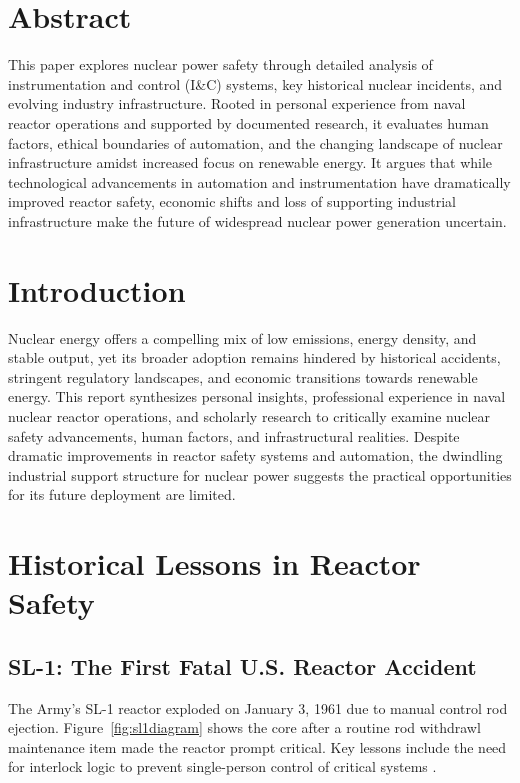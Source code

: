 \documentclass[12pt]{article}
\begin{document}
\section*{Abstract}
This paper explores nuclear power safety through detailed analysis of instrumentation and control (I\&C) systems, key historical nuclear incidents, and evolving industry infrastructure. Rooted in personal experience from naval reactor operations and supported by documented research, it evaluates human factors, ethical boundaries of automation, and the changing landscape of nuclear infrastructure amidst increased focus on renewable energy. It argues that while technological advancements in automation and instrumentation have dramatically improved reactor safety, economic shifts and loss of supporting industrial infrastructure make the future of widespread nuclear power generation uncertain.

\newpage

\section{Introduction}
Nuclear energy offers a compelling mix of low emissions, energy density, and stable output, yet its broader adoption remains hindered by historical accidents, stringent regulatory landscapes, and economic transitions towards renewable energy. This report synthesizes personal insights, professional experience in naval nuclear reactor operations, and scholarly research to critically examine nuclear safety advancements, human factors, and infrastructural realities. Despite dramatic improvements in reactor safety systems and automation, the dwindling industrial support structure for nuclear power suggests the practical opportunities for its future deployment are limited.

\section{Historical Lessons in Reactor Safety}

\subsection{SL-1: The First Fatal U.S. Reactor Accident}
The Army's SL-1 reactor exploded on January 3, 1961 due to manual control rod ejection. Figure~\ref{fig:sl1diagram} shows the core after a routine rod withdrawl maintenance item made the reactor prompt critical. Key lessons include the need for interlock logic to prevent single-person control of critical systems \autocite{sl1report}.
\end{document}
